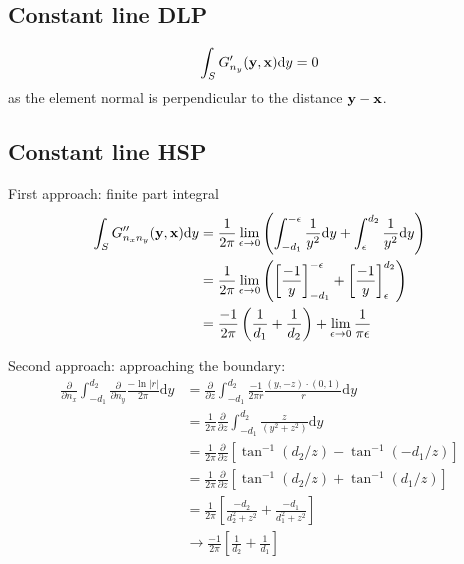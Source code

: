 \documentclass[a4paper,11pt]{article}
\newcommand{\td}{\mathrm{d}}
\begin{document}
\subsection{Constant line DLP}

\begin{equation}
\int_{S} G'_{n_y}({\bf y}, {\bf x}) \td y = 0
\end{equation}
%
as the element normal is perpendicular to the distance ${\bf y}-{\bf x}$.

\subsection{Constant line HSP}

First approach: finite part integral
%
\begin{align}
\int_{S} G''_{n_x n_y}({\bf y}, {\bf x}) \td y
&= \frac{1}{2\pi} \lim_{\epsilon \to 0} \left(\int_{-d_1}^{-\epsilon} \frac{1}{y^2}\td y + \int_{\epsilon}^{d_2} \frac{1}{y^2} \td y\right) \nonumber \\
&= \frac{1}{2\pi} \lim_{\epsilon \to 0} \left(\left[\frac{-1}{y}\right]_{-d_1}^{-\epsilon} +  \left[\frac{-1}{y}\right]_{\epsilon}^{d_2} \right)
\nonumber \\
&= \frac{-1}{2\pi} \left(\frac{1}{d_1} +  \frac{1}{d_2} \right) + \lim_{\epsilon \to 0} \frac{1}{\pi\epsilon}
\end{align}


Second approach: approaching the boundary:
%
\begin{align}
\frac{\partial}{\partial n_x}
\int_{-d_1}^{d_2} 
\frac{\partial}{\partial n_y}
\frac{-\ln |r|}{2\pi}
\td y 
&=
\frac{\partial}{\partial z}
\int_{-d_1}^{d_2} 
\frac{-1}{2\pi r} \frac{(y, -z) \cdot (0,1)}{r}
\td y \nonumber \\
&=
\frac{1}{2\pi} \frac{\partial}{\partial z}
\int_{-d_1}^{d_2} 
\frac{z}{\left(y^2+z^2\right)}
\td y \nonumber \\
&=
\frac{1}{2\pi} \frac{\partial}{\partial z}
\left[
\tan^{-1}\left(d_2/z\right)
-
\tan^{-1}\left(-d_1/z\right)
\right]
\nonumber \\
&=
\frac{1}{2\pi} \frac{\partial}{\partial z}
\left[
\tan^{-1}\left(d_2/z\right) + \tan^{-1}\left(d_1/z\right)
\right]
\nonumber \\
&=
\frac{1}{2\pi} 
\left[
\frac{-d_2}{d_2^2+z^2} + \frac{-d_1}{d_1^2+z^2}
\right]
\nonumber \\
& \to
\frac{-1}{2\pi} 
\left[
\frac{1}{d_2} + \frac{1}{d_1}
\right]
\end{align}
\end{document}
